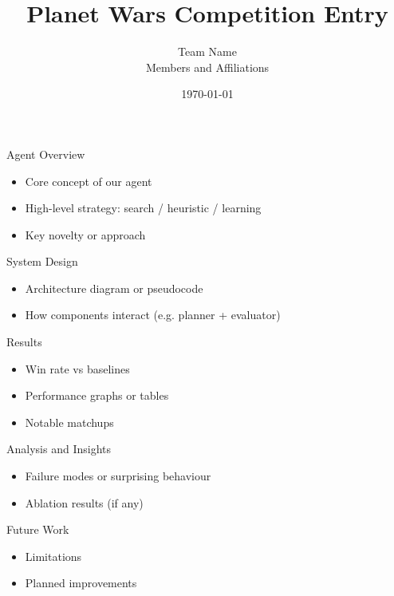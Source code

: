 \documentclass{beamer}
\title{Planet Wars Competition Entry}
\author{Team Name \\ Members and Affiliations}
\date{\today}
\begin{document}
\frame{\titlepage}

\begin{frame}{Agent Overview}
  \begin{itemize}
    \item Core concept of our agent
    \item High-level strategy: search / heuristic / learning
    \item Key novelty or approach
  \end{itemize}
\end{frame}

\begin{frame}{System Design}
  \begin{itemize}
    \item Architecture diagram or pseudocode
    \item How components interact (e.g. planner + evaluator)
  \end{itemize}
\end{frame}

\begin{frame}{Results}
  \begin{itemize}
    \item Win rate vs baselines
    \item Performance graphs or tables
    \item Notable matchups
  \end{itemize}
\end{frame}

\begin{frame}{Analysis and Insights}
  \begin{itemize}
    \item Failure modes or surprising behaviour
    \item Ablation results (if any)
  \end{itemize}
\end{frame}

\begin{frame}{Future Work}
  \begin{itemize}
    \item Limitations
    \item Planned improvements
  \end{itemize}
\end{frame}
\end{document}
